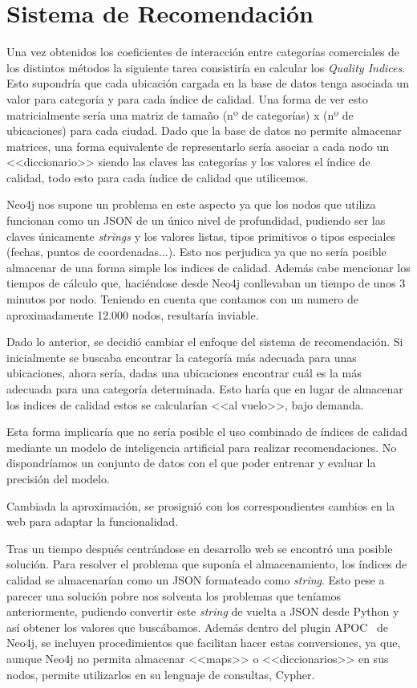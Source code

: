 \section{Sistema de Recomendación}

Una vez obtenidos los coeficientes de interacción entre categorías comerciales de los distintos métodos la siguiente tarea consistiría en calcular los \textit{Quality Indices}. Esto supondría que cada ubicación cargada en la base de datos tenga asociada un valor para categoría y para cada índice de calidad. Una forma de ver esto matricialmente sería una matriz de tamaño (nº de categorías) x (nº de ubicaciones) para cada ciudad. Dado que la base de datos no permite almacenar matrices, una forma equivalente de representarlo sería asociar a cada nodo un <<diccionario>> siendo las claves las categorías y los valores el índice de calidad, todo esto para cada índice de calidad que utilicemos.

Neo4j nos supone un problema en este aspecto ya que los nodos que utiliza funcionan como un JSON de un único nivel de profundidad, pudiendo ser las claves únicamente \textit{strings} y los valores listas, tipos primitivos o tipos especiales (fechas, puntos de coordenadas...). Esto nos perjudica ya que no sería posible almacenar de una forma simple los indices de calidad. Además cabe mencionar los tiempos de cálculo que, haciéndose desde Neo4j conllevaban un tiempo de unos 3 minutos por nodo. Teniendo en cuenta que contamos con un numero de aproximadamente 12.000 nodos, resultaría inviable.

Dado lo anterior, se decidió cambiar el enfoque del sistema de recomendación. Si inicialmente se buscaba encontrar la categoría más adecuada para unas ubicaciones, ahora sería, dadas una ubicaciones encontrar cuál es la más adecuada para una categoría determinada. Esto haría que en lugar de almacenar los indices de calidad estos se calcularían <<al vuelo>>, bajo demanda.

Esta forma implicaría que no sería posible el uso combinado de índices de calidad mediante un modelo de inteligencia artificial para realizar recomendaciones. No dispondríamos un conjunto de datos con el que poder entrenar y evaluar la precisión del modelo.

Cambiada la aproximación, se prosiguió con los correspondientes cambios en la web para adaptar la funcionalidad.

Tras un tiempo después centrándose en desarrollo web se encontró una posible solución. Para resolver el problema que suponía el almacenamiento, los índices de calidad se almacenarían como un JSON formateado como \textit{string}. Esto pese a parecer una solución pobre nos solventa los problemas que teníamos anteriormente, pudiendo convertir este \textit{string} de vuelta a JSON desde Python y así obtener los valores que buscábamos. Además dentro del plugin APOC~\cite{APOC} de Neo4j, se incluyen procedimientos que facilitan hacer estas conversiones, ya que, aunque Neo4j no permita almacenar <<maps>> o <<diccionarios>> en sus nodos, permite utilizarlos en su lenguaje de consultas, Cypher.

